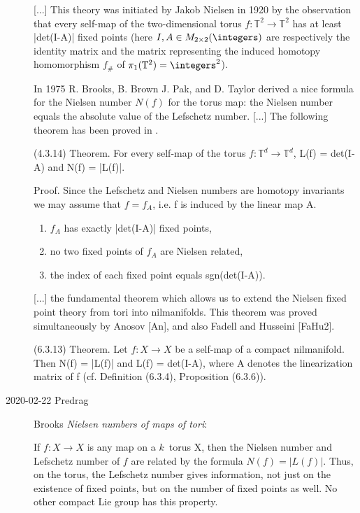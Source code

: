 \begin{description}
[...]
This theory was initiated by Jakob Nielsen in 1920
by the
observation that every self-map of the two-dimensional torus
$f:\mathbb{T}^2\to \mathbb{T}^2$  has at least |det(I-A)| fixed points
(here $I, A\in  M_{2{\times}2}(\integers)$ are respectively the identity
matrix and the matrix representing the induced homotopy homomorphism
$f_\#$ of $\pi_1(\mathbb{T}^2) = \integers^2$).

In 1975 R. Brooks, B. Brown J. Pak, and D. Taylor
derived a
nice formula for the Nielsen number $N(f)$ for the torus map: the Nielsen
number equals the absolute value of the Lefschetz number.
[...] The following theorem has been proved in .

(4.3.14) Theorem. For every self-map of the torus $f: \mathbb{T}^d \to
\mathbb{T}^d$, L(f) = det(I-A) and N(f) = |L(f)|.

Proof. Since the Lefschetz and Nielsen numbers are homotopy invariants we
may assume that $f = f_A$, i.e. f is induced by the linear map A.

\begin{enumerate}
  \item $f_A$ has exactly |det(I-A)| fixed points,
  \item no two fixed points of $f_A$ are Nielsen related,
  \item the index of each fixed point equals sgn(det(I-A)).
\end{enumerate}


[...] the fundamental theorem which allows us to extend the Nielsen fixed
point theory from tori into nilmanifolds. This theorem was proved
simultaneously by Anosov [An], and also Fadell and Husseini [FaHu2].

(6.3.13) Theorem. Let $f:X \to X$ be a self-map of a compact nilmanifold.
Then N(f) = |L(f)| and L(f) = det(I-A), where A denotes the
linearization matrix of f (cf. Definition (6.3.4), Proposition (6.3.6)).

\item[2020-02-22 Predrag]
Brooks \etal{}
{\em Nielsen numbers of maps of tori}:

If  $f:  X  \to X$  is  any  map on a $k$\dmn\ torus  X,  then the
Nielsen number and Lefschetz number of $f$  are  related by  the  formula
$N(f)=|L(f)|$.   Thus, on  the torus, the  Lefschetz number gives
information, not  just on  the existence of fixed points, but  on  the
number of  fixed points as  well. No  other compact Lie group has this
property.


\end{description}
